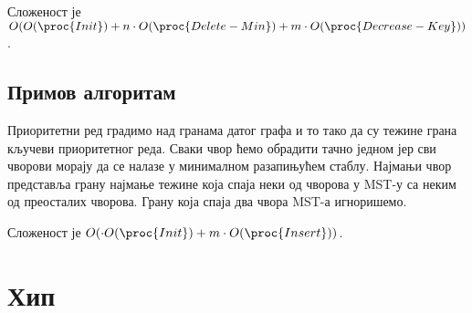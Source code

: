 \documentclass[11pt, a4paper]{article}
\theoremstyle{remark}
\numberwithin{equation}{section}
\begin{document}
	\begin{comment}
	\begin{codebox}
		\Procname{\proc{Dijkstra}($G$, $source$)}
		\li $dist[source]=0$
		\li \For \textbf{each} $v$ in $G$
		\li \Do \If $v\neq source$
		\li \Do $dist[v]=\infty$
		\End \End
		\li $Q=\proc{Priority-Queue-Empty-Node}()$
		\li \proc{Priority-Queue-Init}($Q$) \Comment{\selectlanguage{russian}сви чворови су додати у ред}
		\li \While $Q$ nije prazan
		\li \Do $v=\proc{Priority-Queue-Delete-Min}(Q)$
		\li \For \textbf{each} $u$ in $v.adjacent$
		\li \Do \If $dist[u]>dist[v]+e(v, u)$
		\li \Do $dist[u]=dist[v]+e(v, u)$
		\li \proc{Priority-Queue-Decrease-Key}($Q$, $u$, $dist[u]$)
	\end{codebox}
	\end{comment}
	
	\noindent Сложеност је $O(O(\proc{Init})+n \cdot O(\proc{Delete-Min})+m \cdot O(\proc{Decrease-Key}))$.
	
	\subsection{Примов алгоритам}
	Приоритетни ред градимо над гранама датог графа и то тако да су тежине грана кључеви приоритетног реда. Сваки чвор ћемо обрадити тачно једном јер сви чворови морају да се налазе у минималном разапињућем стаблу. Најмањи чвор представља грану најмање тежине која спаја неки од чворова у MST-у са неким од преосталих чворова. Грану која спаја два чвора MST-а игноришемо. \\
	
	\begin{comment}
	\begin{codebox}
		\Procname{\proc{Prim}($G$, $source$)}
		\li $Q=\proc{Priority-Queue-Empty-Node}()$
		\li \proc{Priority-Queue-Init}($Q$) \Comment{\selectlanguage{russian}све гране $source$ чвора су додате у ред}
		\li \While $MST.size \neq G.n$
		\li \Do  $e=\proc{Priority-Queue-Delete-Min}(Q)$
		\li \If $e.v \notin MST$
		\li \Do $MST.add(e)$
		\li \For \textbf{each} $u$ in $(e.v).adjacent$
		\li \Do \proc{Priority-Queue-Insert}($Q$, $e(e.v, u)$)
		\End \End \End
		\li \Return $MST$
	\end{codebox}
	\end{comment}
	
	\noindent Сложеност је $O(\cdot O(\proc{Init})+m\cdot O(\proc{Insert}))$. \\
	
	\newpage
	\section{Хип}
	
\end{document}
